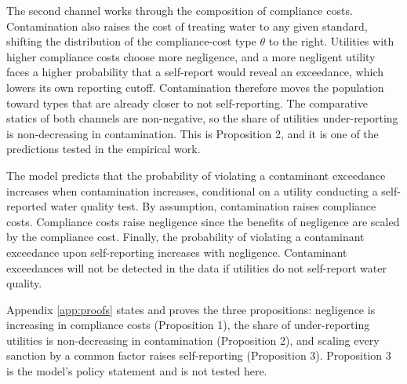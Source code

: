 \documentclass[12pt]{article}
\begin{document}
	The second channel works through the composition of compliance costs. Contamination also raises the cost of treating water to any given standard, shifting the distribution of the compliance-cost type $\theta$ to the right. Utilities with higher compliance costs choose more negligence, and a more negligent utility faces a higher probability that a self-report would reveal an exceedance, which lowers its own reporting cutoff. Contamination therefore moves the population toward types that are already closer to not self-reporting. The comparative statics of both channels are non-negative, so the share of utilities under-reporting is non-decreasing in contamination. This is Proposition 2, and it is one of the predictions tested in the empirical work.

    The model predicts that the probability of violating a contaminant exceedance increases when contamination increases, conditional on a utility conducting a self-reported water quality test. By assumption, contamination raises compliance costs. Compliance costs raise negligence since the benefits of negligence are scaled by the compliance cost. Finally, the probability of violating a contaminant exceedance upon self-reporting increases with negligence. Contaminant exceedances will not be detected in the data if utilities do not self-report water quality.


	Appendix \ref{app:proofs} states and proves the three propositions: negligence is increasing in compliance costs (Proposition 1), the share of under-reporting utilities is non-decreasing in contamination (Proposition 2), and scaling every sanction by a common factor raises self-reporting (Proposition 3). Proposition 3 is the model's policy statement and is not tested here.
\end{document}
